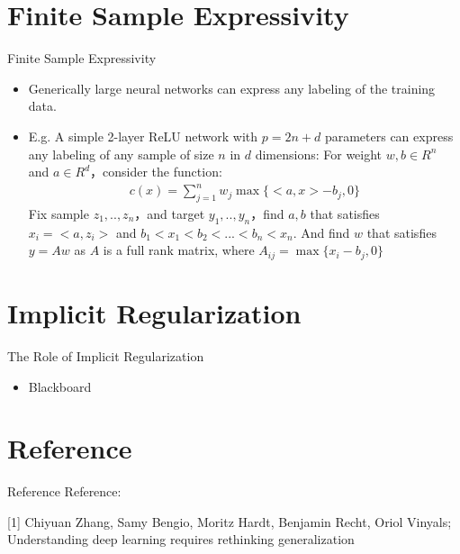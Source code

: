 \documentclass[mathserif]{beamer}
\begin{document}
\section{Finite Sample Expressivity}
\begin{frame}[t]{Finite Sample Expressivity}
  \begin{itemize}
    \item Generically large neural networks can express any labeling of
    the training data.
    \item E.g. A simple 2-layer ReLU network with $p=2n+d$ parameters
    can express any labeling of any sample of size $n$ in $d$ dimensions:
    For weight $w,b\in R^{n}$ and $a\in R^{d}$，consider the function:
    \begin{align}
      c(x)=\sum_{j=1}^{n}w_{j}\max\{<a,x>-b_{j},0\}
    \end{align}
    Fix sample $z_{1},..,z_{n}$，and target $y_{1},..,y_{n}$，find $a,b$
    that satisfies $x_{i}=<a,z_{i}>$ and $b_{1}<x_{1}<b_{2}<...<b_{n}<x_{n}$.
    And find $w$ that satisfies $y=Aw$ as $A$ is a full rank matrix, where
    $A_{ij}=\max\{x_{i}-b_{j},0\}$
  \end{itemize}
\end{frame}
\section{Implicit Regularization}
\begin{frame}[t]{The Role of Implicit Regularization}
  \begin{itemize}
    \item Blackboard
  \end{itemize}
\end{frame}

\section{Reference}
\begin{frame}{Reference}
  Reference:

  [1] Chiyuan Zhang, Samy Bengio, Moritz Hardt, Benjamin Recht, Oriol Vinyals; Understanding deep learning requires rethinking generalization
\end{frame}
\end{document}
